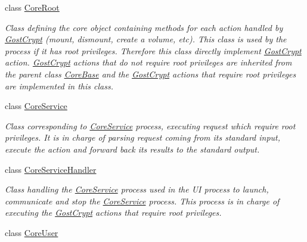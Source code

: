 \begin{DoxyCompactItemize}
class \hyperlink{class_gost_crypt_1_1_core_1_1_core_root}{Core\+Root}
\begin{DoxyCompactList}\small\item\em Class defining the core object containing methods for each action handled by \hyperlink{namespace_gost_crypt}{Gost\+Crypt} (mount, dismount, create a volume, etc). This class is used by the process if it has root privileges. Therefore this class directly implement \hyperlink{namespace_gost_crypt}{Gost\+Crypt} action. \hyperlink{namespace_gost_crypt}{Gost\+Crypt} actions that do not require root privileges are inherited from the parent class \hyperlink{class_gost_crypt_1_1_core_1_1_core_base}{Core\+Base} and the \hyperlink{namespace_gost_crypt}{Gost\+Crypt} actions that require root privileges are implemented in this class. \end{DoxyCompactList}\item 
class \hyperlink{class_gost_crypt_1_1_core_1_1_core_service}{Core\+Service}
\begin{DoxyCompactList}\small\item\em Class corresponding to \hyperlink{class_gost_crypt_1_1_core_1_1_core_service}{Core\+Service} process, executing request which require root privileges. It is in charge of parsing request coming from its standard input, execute the action and forward back its results to the standard output. \end{DoxyCompactList}\item 
class \hyperlink{class_gost_crypt_1_1_core_1_1_core_service_handler}{Core\+Service\+Handler}
\begin{DoxyCompactList}\small\item\em Class handling the \hyperlink{class_gost_crypt_1_1_core_1_1_core_service}{Core\+Service} process used in the UI process to launch, communicate and stop the \hyperlink{class_gost_crypt_1_1_core_1_1_core_service}{Core\+Service} process. This process is in charge of executing the \hyperlink{namespace_gost_crypt}{Gost\+Crypt} actions that require root privileges. \end{DoxyCompactList}\item 
class \hyperlink{class_gost_crypt_1_1_core_1_1_core_user}{Core\+User}

\end{DoxyCompactItemize}
